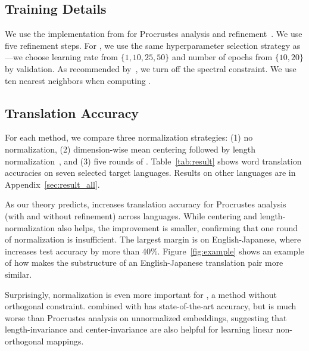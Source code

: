 \vspace{.8em}
\subsection{Training Details}
\vspace{.4em}

We use the implementation from  for Procrustes analysis and
refinement~\citep{conneau-18}.  We use five refinement steps.
For , we use the same hyperparameter selection strategy as
\citet{joulin-18}---we choose learning rate from $\{1, 10, 25, 50\}$ and number
of epochs from $\{10, 20\}$ by validation.
As recommended by~\citet{joulin-18}, we turn off the spectral constraint.
We use ten nearest neighbors when computing .

\vspace{.8em}
\subsection{Translation Accuracy}
\vspace{.4em}

For each method, we compare three normalization strategies:
(1) no normalization,
(2) dimension-wise mean centering followed by length normalization~\citep{artetxe-16},
and (3) five rounds of \name{}.  
Table~\ref{tab:result} shows word translation accuracies on seven selected
target languages.  Results on other languages are in
Appendix~\ref{sec:result_all}.

As our theory predicts, \name{} increases translation accuracy for Procrustes
analysis (with and without refinement) across languages.
While centering and length-normalization also helps, the improvement is smaller,
confirming that one round of normalization is insufficient.
The largest margin is on English-Japanese, where \name{} increases test
accuracy by more than 40\%.
Figure~\ref{fig:example} shows an example of how \name{} makes the substructure
of an English-Japanese translation pair more similar. 

Surprisingly, normalization is even more important for , a 
method without orthogonal constraint.
 combined with \name{} has state-of-the-art accuracy,
but  is much worse than Procrustes analysis on unnormalized
embeddings,
suggesting that length-invariance and center-invariance are also helpful
for learning linear non-orthogonal mappings.

